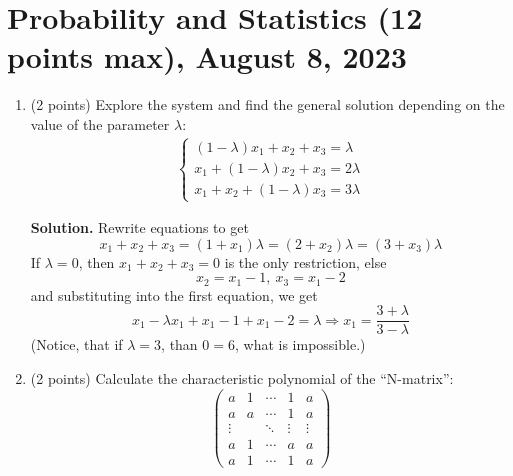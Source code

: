 \documentclass{article}
\begin{document}
\section*{Probability and Statistics (12 points max), August 8, 2023}

\begin{enumerate}
  \item (2 points) Explore the system and find the general solution depending on the value of the parameter $\lambda$:
  \begin{align*}
    \begin{cases}
      (1 - \lambda)x_1 + x_2 + x_3 = \lambda \\
      x_1 + (1 - \lambda)x_2 + x_3 = 2\lambda \\
      x_1 + x_2 + (1 - \lambda)x_3 = 3\lambda
    \end{cases}
  \end{align*}

  \textbf{Solution.} Rewrite equations to get 
  $$ x_1 + x_2 + x_3 = (1+x_1)\lambda = (2+x_2)\lambda = (3+x_3)\lambda$$
  If $\lambda = 0$, then $x_1 + x_2 + x_3 = 0$ is the only restriction, else
  $$ x_2 = x_1-1,\ x_3 = x_1-2 $$
  and substituting into the first equation, we get
  $$ x_1 - \lambda x_1 + x_1-1 + x_1-2 = \lambda \Rightarrow x_1 = \frac{3+\lambda}{3-\lambda} $$
  (Notice, that if $\lambda = 3$, than $0 = 6$, what is impossible.)

  \item (2 points) Calculate the characteristic polynomial of the ``N-matrix'':
  \[
    \begin{pmatrix}
      a & 1 & \cdots & 1 & a \\
      a & a & \cdots & 1 & a \\
      \vdots &  & \ddots & \vdots & \vdots \\
      a & 1 & \cdots & a & a \\
      a & 1 & \cdots & 1 & a
      \end{pmatrix} \]


\end{enumerate}
\end{document}
